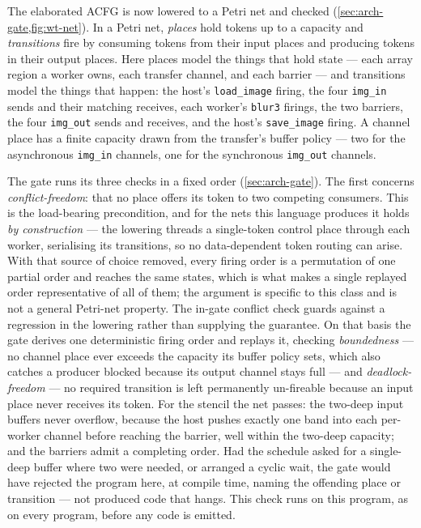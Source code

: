 The elaborated ACFG is now lowered to a Petri net and checked
(\cref{sec:arch-gate,fig:wt-net}). In a Petri net, \emph{places} hold tokens up to a
capacity and \emph{transitions} fire by consuming tokens from their input places and
producing tokens in their output places. Here places model the things that hold
state --- each array region a worker owns, each transfer channel, and each barrier
--- and transitions model the things that happen: the host's \texttt{load\_image} firing,
the four \texttt{img\_in} sends and their matching receives, each worker's
\texttt{blur3} firings, the two barriers, the four \texttt{img\_out} sends and
receives, and the host's \texttt{save\_image} firing. A channel place has a finite
capacity drawn from the transfer's buffer policy --- two for the asynchronous
\texttt{img\_in} channels, one for the synchronous \texttt{img\_out} channels.

The gate runs its three checks in a fixed order (\cref{sec:arch-gate}). The first
concerns \emph{conflict-freedom}: that no place offers its token to two competing
consumers. This is the load-bearing precondition, and for the nets this language
produces it holds \emph{by construction} --- the lowering threads a single-token
control place through each worker, serialising its transitions, so no data-dependent
token routing can arise. With that source of choice removed, every firing order is a
permutation of one partial order and reaches the same states, which is what makes a
single replayed order representative of all of them; the argument is specific to this
class and is not a general Petri-net property. The in-gate conflict check guards
against a regression in the lowering rather than supplying the guarantee. On that
basis the gate derives one deterministic firing order and replays it, checking
\emph{boundedness} --- no channel place ever exceeds the capacity its buffer policy
sets, which also catches a producer blocked because its output channel stays full ---
and \emph{deadlock-freedom} --- no required transition is left permanently
un-fireable because an input place never receives its token. For the stencil the net passes:
the two-deep input buffers never overflow, because the host pushes exactly one band
into each per-worker channel before reaching the barrier, well within the two-deep
capacity; and the barriers admit a completing order. Had the schedule
asked for a single-deep buffer where two were needed, or arranged a cyclic wait,
the gate would have rejected the program here, at compile time, naming the
offending place or transition --- not produced code that hangs. This check runs on
this program, as on every program, before any code is emitted.

